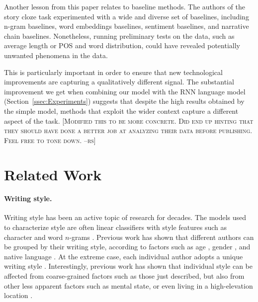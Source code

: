 \documentclass[11pt,a4paper]{article}
\newcommand{\secref}[1]{Section~\ref{ssec:#1}}
\newcommand{\isection}[2]{\section{#1}\label{ssec:#2}}
\newcommand{\resolved}[1]{}
\newcommand{\roy}[1]{{\color{orange}\textsc{[#1 --rs]}}}
\newcommand{\nascomment}[1]{{\color{blue}\textsc{[#1 --nas]}}}
\begin{document}
Another lesson from this paper relates to baseline methods. 
The authors of the story cloze task experimented with a wide and diverse set of baselines, including n-gram baselines, word embeddings baselines, sentiment baselines, and narrative chain baselines. 
Nonetheless, running preliminary tests on the data, such as average length or  POS and word distribution,  could have revealed potentially unwanted phenomena in the data.
\resolved{\nascomment{this paragraph needs extra care.  the authors of the ROC
  paper did try to control for a lot of things and they did run
  baselines.  we ought to be generous and reiterate that here.  what,
  precisely, did they miss?  the lesson isn't just ``run more controls
  and baselines'' is it?}
First, it stresses the need to carefully control for even seemingly minor details. 
Second, it emphasizes the importance of running baseline models.
While recent advances in NLP  suggest that many classic NLP methods are out-of-date, 
this is not necessarily the case, especially for small
datasets. \nascomment{ this bit about simple models feels like a red herring}}
This is particularly important in order to ensure that  new technological improvements are capturing a qualitatively different signal.
The substantial improvement we get when combining our model
with the RNN language model (\secref{Experiments}) suggests that
despite the high results obtained by the simple model, 
methods that exploit the wider context  capture a different aspect of the
task. \resolved{\nascomment{I like ending on this happier note, but let's not
  call it ``luck'' and let's focus on the task and representations,
  not the ML methods, which are probably not the heart of the difference}}
  \roy{Modified this to be more concrete. Did end up hinting that they should have done a better job at analyzing their data before publishing. Feel free to tone down.}

\isection{Related Work}{Related}

\paragraph{Writing style.}
Writing style has been an active topic of research for decades. 
The models used to characterize style are often linear classifiers with style features such as character and word $n$-grams \cite{Stamatatos:2009,Koppel:2009}.
Previous work has shown that different authors can be grouped by their
writing style, according to factors such as age
\cite{Pennebaker:2003,Argamon:2003,Schler:2006,Rosenthal:2011,nguyen:2011:latech},
gender \cite{Argamon:2003,Schler:2006,bamman2014gender}, and native language
\cite{Koppel:2005,Tsur:2007,Bergsma:2012}.   \resolved{\nascomment{cite generously here, it costs us nothing}}
At the extreme case, each individual author adopts a unique writing
style \cite{mosteller1963inference,pennebaker1999linguistic,Schwartz:2013}. 
Interestingly, previous work has shown that individual style can be affected from coarse-grained factors such as those just described, but also from other less apparent factors such as mental state, or even living in a high-elevation location \cite{schwartz2013personality}.
\end{document}
